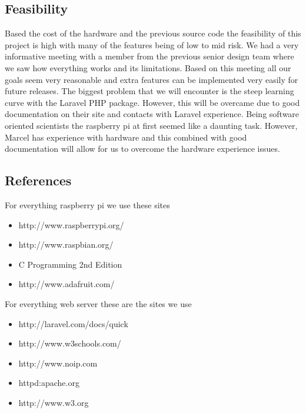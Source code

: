 \documentclass{report}
\begin{document}
\subsection*{Feasibility}
Based the cost of the hardware and the previous source code the feasibility of this project is high with many of the features being of low to mid risk. 
We had a very informative meeting with a member from the previous senior design team where we saw how everything works and its limitations.
Based on this meeting all our goals seem very reasonable and extra features can be implemented very easily for future releases.
The biggest problem that we will encounter is the steep learning curve with the Laravel PHP package.
However, this will be overcame due to good documentation on their site and contacts with Laravel experience.
Being software oriented scientists the raspberry pi at first seemed like a daunting task. 
However, Marcel has experience with hardware and this combined with good documentation will allow for us to overcome the hardware experience issues.

\newpage
\subsection*{References}
For everything raspberry pi we use these sites
\begin{itemize}
\item http://www.raspberrypi.org/
\item http://www.raspbian.org/
\item C Programming 2nd Edition
\item http://www.adafruit.com/
\end{itemize}
For everything web server these are the sites we use
\begin{itemize}
\item http://laravel.com/docs/quick
\item http://www.w3schools.com/
\item http://www.noip.com
\item httpd:apache.org
\item http://www.w3.org
\end{itemize}
\newpage
\end{document}
